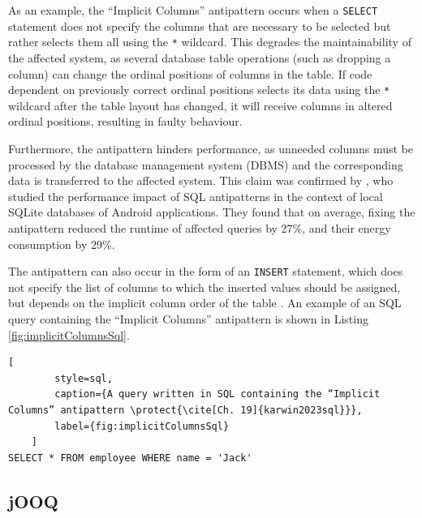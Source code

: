 \documentclass{article}
\begin{document}
As an example, the “Implicit Columns” antipattern \cite[Ch. 19]{karwin2023sql} occurs when a \lstinline{SELECT} statement does not specify the columns that are necessary to be selected but rather selects them all using the \lstinline{*} wildcard. This degrades the maintainability of the affected system, as several database table operations (such as dropping a column) can change the ordinal positions of columns in the table. If code dependent on previously correct ordinal positions selects its data using the \lstinline{*} wildcard after the table layout has changed, it will receive columns in altered ordinal positions, resulting in faulty behaviour.

Furthermore, the antipattern hinders performance, as unneeded columns must be processed by the database management system (DBMS) and the corresponding data is transferred to the affected system. This claim was confirmed by \textcite[p. 60]{lyu2019quantifying}, who studied the performance impact of SQL antipatterns in the context of local SQLite databases of Android applications. They found that on average, fixing the antipattern reduced the runtime of affected queries by 27\%, and their energy consumption by 29\%.

The antipattern can also occur in the form of an \lstinline{INSERT} statement, which does not specify the list of columns to which the inserted values should be assigned, but depends on the implicit column order of the table \cite[Ch. 19]{karwin2023sql}. An example of an SQL query containing the “Implicit Columns” antipattern is shown in Listing \ref{fig:implicitColumnsSql}.

\noindent\begin{minipage}{\textwidth}
    \begin{lstlisting}[
        style=sql, 
        caption={A query written in SQL containing the “Implicit Columns” antipattern \protect{\cite[Ch. 19]{karwin2023sql}}}, 
        label={fig:implicitColumnsSql}
    ]
SELECT * FROM employee WHERE name = 'Jack'
    \end{lstlisting}
\end{minipage}

\subsection{jOOQ}\label{sec:jooq}
\end{document}
